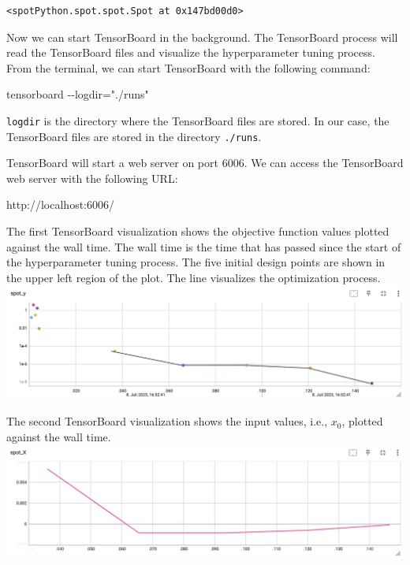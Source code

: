 \documentclass[
  letterpaper,
  DIV=11,
  numbers=noendperiod]{scrreprt}
\newenvironment{Shaded}{\begin{snugshade}}{\end{snugshade}}
\newcommand{\NormalTok}[1]{\textcolor[rgb]{0.00,0.23,0.31}{#1}}
\begin{document}
\begin{verbatim}
<spotPython.spot.spot.Spot at 0x147bd00d0>
\end{verbatim}

Now we can start TensorBoard in the background. The TensorBoard process
will read the TensorBoard files and visualize the hyperparameter tuning
process. From the terminal, we can start TensorBoard with the following
command:

\begin{Shaded}
\begin{Highlighting}[]
\NormalTok{tensorboard {-}{-}logdir="./runs"}
\end{Highlighting}
\end{Shaded}

\texttt{logdir} is the directory where the TensorBoard files are stored.
In our case, the TensorBoard files are stored in the directory
\texttt{./runs}.

TensorBoard will start a web server on port 6006. We can access the
TensorBoard web server with the following URL:

\begin{Shaded}
\begin{Highlighting}[]
\NormalTok{http://localhost:6006/}
\end{Highlighting}
\end{Shaded}

The first TensorBoard visualization shows the objective function values
plotted against the wall time. The wall time is the time that has passed
since the start of the hyperparameter tuning process. The five initial
design points are shown in the upper left region of the plot. The line
visualizes the optimization process.
\includegraphics{figures_static/01_tensorboard_01.png}

The second TensorBoard visualization shows the input values, i.e.,
\(x_0\), plotted against the wall time.
\includegraphics{figures_static/01_tensorboard_02.png}
\end{document}

